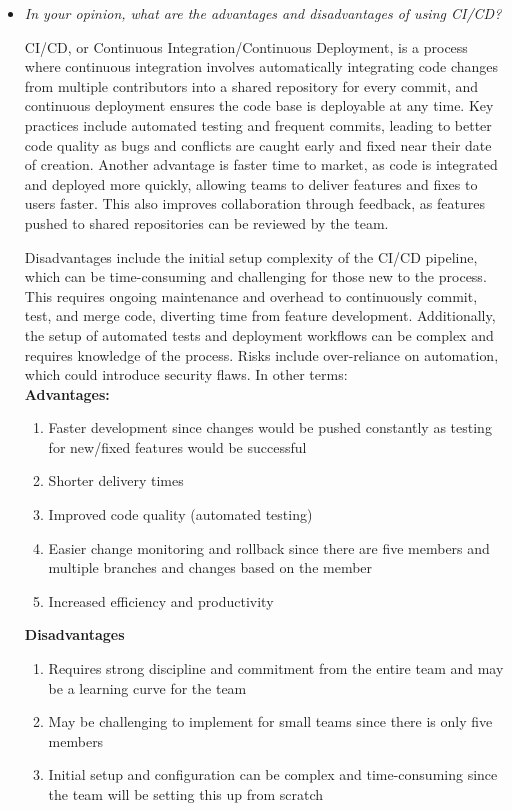 \documentclass{article}
\begin{document}
\begin{itemize}
  \item \textit{In your opinion, what are the advantages and
    disadvantages of using CI/CD?}

    CI/CD, or Continuous Integration/Continuous Deployment, is a
    process where continuous integration involves automatically
    integrating code changes from multiple contributors into a shared
    repository for every commit, and continuous deployment ensures
    the code base is deployable at any time. Key practices include
    automated testing and frequent commits, leading to better code
    quality as bugs and conflicts are caught early and fixed near
    their date of creation. Another advantage is faster time to
    market, as code is integrated and deployed more quickly, allowing
    teams to deliver features and fixes to users faster. This also
    improves collaboration through feedback, as features pushed to
    shared repositories can be reviewed by the team.

    Disadvantages include the initial setup complexity of the CI/CD
    pipeline, which can be time-consuming and challenging for those
    new to the process. This requires ongoing maintenance and
    overhead to continuously commit, test, and merge code, diverting
    time from feature development. Additionally, the setup of
    automated tests and deployment workflows can be complex and
    requires knowledge of the process. Risks include over-reliance on
    automation, which could introduce security flaws.
    In other terms:\\
    \textbf{Advantages:}
    \begin{enumerate}
      \item Faster development since changes would be pushed
        constantly as testing for new/fixed features would be successful
      \item Shorter delivery times
      \item Improved code quality (automated testing)
      \item Easier change monitoring and rollback since there are
        five members and multiple branches and changes based on the member
      \item Increased efficiency and productivity
    \end{enumerate}
    \textbf{Disadvantages}
    \begin{enumerate}
      \item Requires strong discipline and commitment from the entire
        team and may be a learning curve for the team
      \item May be challenging to implement for small teams since
        there is only five members
      \item Initial setup and configuration can be complex and
        time-consuming since the team will be setting this up from scratch
    \end{enumerate}

\end{itemize}
\end{document}
